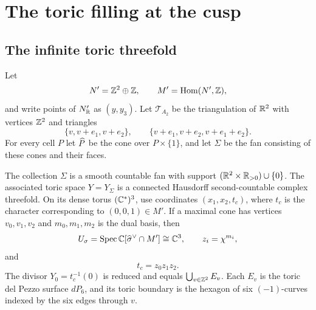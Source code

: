 \section{The toric filling at the cusp}

\subsection{The infinite toric threefold}
Let
\[
 N'=\mathbb Z^2\oplus\mathbb Z,
 \qquad M'=\operatorname{Hom}(N',\mathbb Z),
\]
and write points of $N'_\mathbb R$ as $(y,y_3)$.  Let $\mathcal T_{A_2}$ be
the triangulation of $\mathbb R^2$ with vertices $\mathbb Z^2$ and triangles
\[
 \{v,v+e_1,v+e_2\},
 \qquad
 \{v+e_1,v+e_2,v+e_1+e_2\}.
\]
For every cell $P$ let $\widehat P$ be the cone over $P\times\{1\}$, and let
$\Sigma$ be the fan consisting of these cones and their faces.

\begin{lemma}\label{lem:toric-model}
The collection $\Sigma$ is a smooth countable fan with support
$(\mathbb R^2\times\mathbb R_{>0})\cup\{0\}$.  The associated toric space
$Y=Y_\Sigma$ is a connected Hausdorff second-countable complex
threefold.  On its dense torus $(\mathbb C^*)^3$, use coordinates
$(x_1,x_2,t_c)$, where $t_c$ is the character corresponding to
$(0,0,1)\in M'$.  If a maximal cone has vertices $v_0,v_1,v_2$ and
$m_0,m_1,m_2$ is the dual basis, then
\[
 U_\sigma=\operatorname{Spec}\mathbb C[\widehat\sigma^\vee\cap M']\cong\mathbb C^3,
 \qquad z_i=\chi^{m_i},
\]
and
\begin{equation}\label{eq:toric-local-product}
 t_c=z_0z_1z_2.
\end{equation}
The divisor $Y_0=t_c^{-1}(0)$ is reduced and equals
$\bigcup_{v\in\mathbb Z^2}E_v$.  Each $E_v$ is the toric del Pezzo surface
$dP_6$, and its toric boundary is the hexagon of six $(-1)$-curves indexed
by the six edges through $v$.
\end{lemma}

